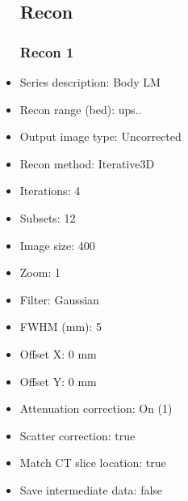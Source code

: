 \documentclass[12pt]{article}
\begin{document}
\begin{itemize}
\subsection{Recon}

\subsubsection{Recon 1}
\item Series description: Body LM
\item Recon range (bed): ups..
\item Output image type: Uncorrected
\item Recon method: Iterative3D
\item Iterations: 4
\item Subsets: 12
\item Image size: 400
\item Zoom: 1
\item Filter: Gaussian
\item FWHM (mm): 5
\item Offset X: 0 mm
\item Offset Y: 0 mm
\item Attenuation correction: On (1)
\item Scatter correction: true
\item Match CT slice location: true
\item Save intermediate data: false
\end{itemize}
\end{document}
